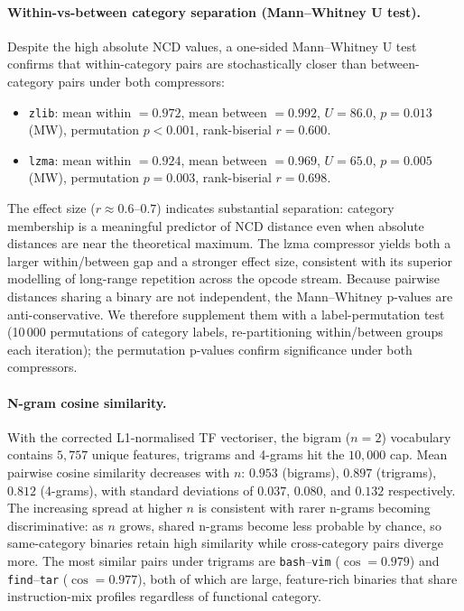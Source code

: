 \documentclass[10pt,twocolumn]{article}
\newcommand{\zlib}{\texttt{zlib}}
\newcommand{\lzma}{\texttt{lzma}}
\begin{document}
\paragraph{Within-vs-between category separation (Mann--Whitney U test).}
Despite the high absolute NCD values, a one-sided Mann--Whitney U test
confirms that within-category pairs are stochastically closer than
between-category pairs under both compressors:
\begin{itemize}
  \item \zlib{}: mean within $= 0.972$, mean between $= 0.992$,
        $U = 86.0$, $p = 0.013$ (MW), permutation $p < 0.001$, rank-biserial $r = 0.600$.
  \item \lzma{}: mean within $= 0.924$, mean between $= 0.969$,
        $U = 65.0$, $p = 0.005$ (MW), permutation $p = 0.003$, rank-biserial $r = 0.698$.
\end{itemize}
The effect size ($r \approx 0.6$--$0.7$) indicates substantial separation:
category membership
is a meaningful predictor of NCD distance even when absolute distances are
near the theoretical maximum.  The lzma compressor yields both a larger
within/between gap and a stronger effect size, consistent with its superior
modelling of long-range repetition across the opcode stream.
Because pairwise distances sharing a binary are not independent, the
Mann--Whitney p-values are anti-conservative.  We therefore supplement them
with a label-permutation test (10\,000 permutations of category labels,
re-partitioning within/between groups each iteration); the permutation
p-values confirm significance under both compressors.

\paragraph{N-gram cosine similarity.}
With the corrected L1-normalised TF vectoriser, the bigram ($n=2$) vocabulary
contains $5{,}757$ unique features, trigrams and 4-grams hit the $10{,}000$
cap.  Mean pairwise cosine similarity decreases with $n$: $0.953$ (bigrams),
$0.897$ (trigrams), $0.812$ (4-grams), with standard deviations of $0.037$,
$0.080$, and $0.132$ respectively.  The increasing spread at higher $n$ is
consistent with rarer n-grams becoming discriminative: as $n$ grows, shared
n-grams become less probable by chance, so same-category binaries retain high
similarity while cross-category pairs diverge more.  The most similar pairs
under trigrams are \texttt{bash}--\texttt{vim} ($\cos = 0.979$) and
\texttt{find}--\texttt{tar} ($\cos = 0.977$), both of which are large,
feature-rich binaries that share instruction-mix profiles regardless of
functional category.
\end{document}
